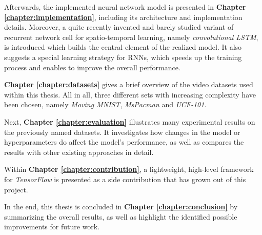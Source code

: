 Afterwards, the implemented neural network model is presented in \textbf{Chapter \ref{chapter:implementation}}, including its architecture and implementation details. Moreover, a quite recently invented and barely studied variant of recurrent network cell for spatio-temporal learning, namely \textit{convolutional LSTM}, is introduced which builds the central element of the realized model. It also suggests a special learning strategy for RNNs, which speeds up the training process and enables to improve the overall performance.

\textbf{Chapter \ref{chapter:datasets}} gives a brief overview of the video datasets used within this thesis. All in all, three different sets with increasing complexity have been chosen, namely \textit{Moving MNIST}, \textit{MsPacman} and \textit{UCF-101}.

Next, \textbf{Chapter \ref{chapter:evaluation}} illustrates many experimental results on the previously named datasets. It investigates how changes in the model or hyperparameters do affect the model's performance, as well as compares the results with other existing approaches in detail.

Within \textbf{Chapter \ref{chapter:contribution}}, a lightweight, high-level framework for \textit{TensorFlow} is presented as a side contribution that has grown out of this project.

In the end, this thesis is concluded in \textbf{Chapter \ref{chapter:conclusion}} by summarizing the overall results, as well as highlight the identified possible improvements for future work.



